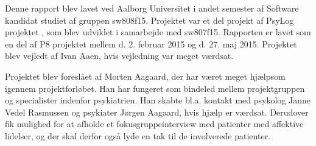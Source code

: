 Denne rapport blev lavet ved Aalborg Universitet i andet semester af Software kandidat studiet af gruppen sw808f15.
Projektet var et del projekt af PsyLog projektet \citep{misc:faellesrapp}, som blev udviklet i samarbejde med sw807f15.
Rapporten er lavet som en del af P8 projektet mellem d. 2. februar 2015 og d. 27. maj 2015.
Projektet blev vejledt af Ivan Aaen, hvis vejledning var meget værdsat.

Projektet blev foreslået af Morten Aagaard, der har været meget hjælpsom igennem projektforløbet.
Han har fungeret som bindeled mellem projektgruppen og specialister indenfor psykiatrien. 
Han skabte bl.a. kontakt med psykolog Janne Vedel Rasmussen og psykiater Jørgen Aagaard, hvis hjælp er værdsat.
Derudover fik mulighed for at afholde et fokusgruppeinterview med patienter med affektive lidelser, og der skal derfor også lyde en tak til de involverede patienter.